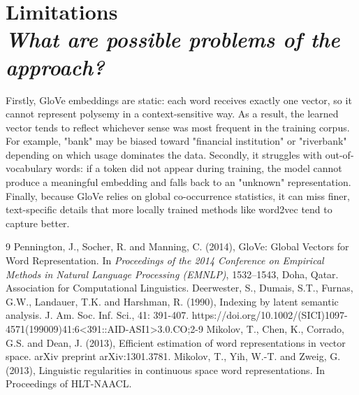 \documentclass[10pt,a4paper]{article}
\begin{document}
\section{\textbf{Limitations} \\ \textit{What are possible problems of the approach?}}
Firstly, GloVe embeddings are static: each word receives exactly one vector, so it cannot represent polysemy in a context-sensitive way. As a result, the learned vector tends to reflect whichever sense was most frequent in the training corpus. For example, "bank" may be biased toward "financial institution" or "riverbank" depending on which usage dominates the data. Secondly, it struggles with out-of-vocabulary words: if a token did not appear during training, the model cannot produce a meaningful embedding and falls back to an "unknown" representation. Finally, because GloVe relies on global co-occurrence statistics, it can miss finer, text-specific details that more locally trained methods like word2vec tend to capture better.

\vspace{0.4em}

\begingroup
\small
\setlength{\parskip}{0.35em}
\begin{thebibliography}{9}
 Pennington, J., Socher, R. and Manning, C. (2014), GloVe: Global Vectors for Word Representation. In \textit{Proceedings of the 2014 Conference on Empirical Methods in Natural Language Processing (EMNLP)}, 1532--1543, Doha, Qatar. Association for Computational Linguistics.
 Deerwester, S., Dumais, S.T., Furnas, G.W., Landauer, T.K. and Harshman, R. (1990), Indexing by latent semantic analysis. J. Am. Soc. Inf. Sci., 41: 391-407. https://doi.org/10.1002/(SICI)1097-4571(199009)41:6<391::AID-ASI1>3.0.CO;2-9
Mikolov, T., Chen, K., Corrado, G.S. and Dean, J. (2013), Efficient estimation of word representations in vector space. arXiv preprint arXiv:1301.3781.
Mikolov, T., Yih, W.-T. and Zweig, G. (2013), Linguistic regularities in continuous space word representations. In Proceedings of HLT-NAACL.

\end{thebibliography}
\endgroup
\end{document}
